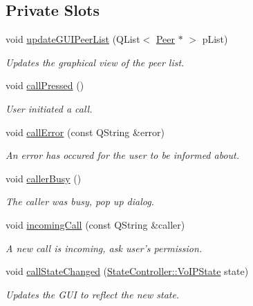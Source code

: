 \subsection*{\-Private \-Slots}
\begin{DoxyCompactItemize}
\item 
void \hyperlink{class_main_window_a780eb14bc5469aa2431a1d605a1bd431}{update\-G\-U\-I\-Peer\-List} (\-Q\-List$<$ \hyperlink{class_peer}{\-Peer} $\ast$ $>$ p\-List)
\begin{DoxyCompactList}\small\item\em \-Updates the graphical view of the peer list. \end{DoxyCompactList}\item 
void \hyperlink{class_main_window_afaa4ef4d091e0f4cf16036d831f30787}{call\-Pressed} ()
\begin{DoxyCompactList}\small\item\em \-User initiated a call. \end{DoxyCompactList}\item 
void \hyperlink{class_main_window_aed9515073081aa1f6cdb4949b5b11194}{call\-Error} (const \-Q\-String \&error)
\begin{DoxyCompactList}\small\item\em \-An error has occured for the user to be informed about. \end{DoxyCompactList}\item 
void \hyperlink{class_main_window_a342dc22be100ae360deb0fca0a0d610a}{caller\-Busy} ()
\begin{DoxyCompactList}\small\item\em \-The caller was busy, pop up dialog. \end{DoxyCompactList}\item 
void \hyperlink{class_main_window_a47e0e25f0b714888d25f3945b9f07185}{incoming\-Call} (const \-Q\-String \&caller)
\begin{DoxyCompactList}\small\item\em \-A new call is incoming, ask user's permission. \end{DoxyCompactList}\item 
void \hyperlink{class_main_window_ac473def8f3f23d0aa997355598be150b}{call\-State\-Changed} (\hyperlink{class_state_controller_a1aabd2155d8e6feb201ed3941e4ee2be}{\-State\-Controller\-::\-Vo\-I\-P\-State} state)
\begin{DoxyCompactList}\small\item\em \-Updates the \-G\-U\-I to reflect the new state. \end{DoxyCompactList}\item 

\end{DoxyCompactItemize}
